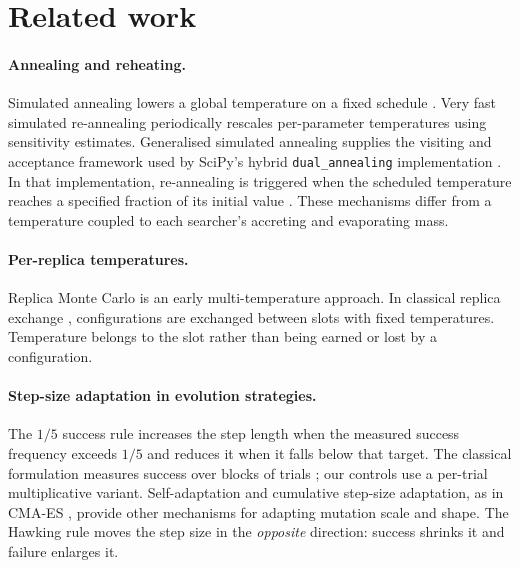 \documentclass[10pt,a4paper]{article}
\begin{document}
\section{Related work}
\label{sec:related}

\paragraph{Annealing and reheating.} Simulated annealing lowers a global temperature
on a fixed schedule \citep{kirkpatrick1983,cerny1985}. Very fast simulated
re-annealing \citep{ingber1989} periodically rescales per-parameter temperatures
using sensitivity estimates. Generalised simulated annealing
\citep{tsallis1996,xiang1997} supplies the visiting and acceptance framework used
by SciPy's hybrid \texttt{dual\_annealing} implementation \citep{virtanen2020}.
In that implementation, re-annealing is triggered when the scheduled temperature
reaches a specified fraction of its initial value \citep{scipydualannealingdocs}.
These mechanisms differ from a temperature coupled to each searcher's
accreting and evaporating mass.

\paragraph{Per-replica temperatures.} Replica Monte Carlo
\citep{swendsen1986} is an early multi-temperature approach. In classical
replica exchange \citep{hukushima1996}, configurations are exchanged between
slots with fixed temperatures. Temperature belongs to the slot rather than
being earned or lost by a configuration.

\paragraph{Step-size adaptation in evolution strategies.} The $1/5$ success rule
\citep{rechenberg1973,schwefel1981} increases the step length when the measured
success frequency exceeds $1/5$ and reduces it when it falls below that target.
The classical formulation measures success over blocks of trials
\citep{beyer2002}; our controls use a per-trial multiplicative variant.
Self-adaptation and cumulative step-size adaptation, as in CMA-ES
\citep{hansen2001,beyer2002}, provide other mechanisms for adapting mutation scale
and shape. The Hawking rule moves the step size
in the \emph{opposite} direction: success shrinks it and failure enlarges it.
\end{document}
